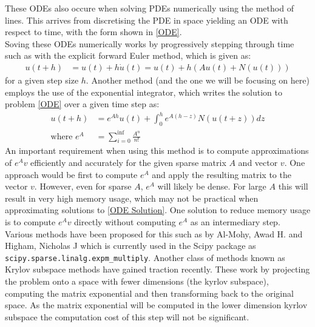 \documentclass{article}
\begin{document}
These ODEs also occure when solving PDEs numerically using the method of lines.
This arrives from discretising the PDE in space yielding an ODE with respect to time, with the form shown in \eqref{ODE}.\\
Soving these ODEs numerically works by progressively stepping through time such as with the explicit forward Euler method, which is given as:
\begin{align*}
u(t+h) &= u(t) + h\dot u(t) = u(t) + h(Au(t) + N(u(t)))
\end{align*}
for a given step size $h$.
Another method (and the one we will be focusing on here) employs the use of the exponential integrator, which writes the solution to problem \eqref{ODE} over a given time step as:
\begin{align*}
u(t+h) &= e^{Ah}u(t) + \int_0^h e^{A(h-z)}N(u(t+z)) dz \label{ODE Solution}\\
\text{where } e^{A} &= \sum^{\inf}_{i = 0}\frac{A^n}{n!}
\end{align*}
An important requirement when using this method is to compute approximations of $e^{A}v$ efficiently and accurately for the given sparse matrix $A$ and vector $v$.
One approach would be first to compute $e^A$ and apply the resulting matrix to the vector $v$.
However, even for sparse $A$, $e^{A}$ will likely be dense. For large $A$ this will result in very high memory usage, which may not be practical when approximating solutions to \eqref{ODE Solution}.
One solution to reduce memory usage is to compute $e^{A}v$ directly without computing $e^{A}$ as an intermediary step.\\
Various methods have been proposed for this such as by Al-Mohy, Awad H. and Higham, Nicholas J\cite{AlMohy2011} which is currently used in the Scipy package as \verb|scipy.sparse.linalg.expm_multiply|.
Another class of methods known as Krylov subspace methods have gained traction recently\cite{Moler2003}.
These work by projecting the problem onto a space with fewer dimensions (the kyrlov subspace), computing the matrix exponential and then transforming back to the original space.
As the matrix exponential will be computed in the lower dimension kyrlov subspace the computation cost of this step will not be significant.

\newpage


\end{document}
